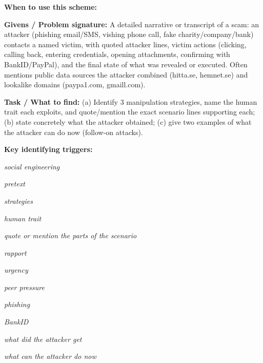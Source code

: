\documentclass[12pt, a4paper]{article}
\begin{document}
\textbf{When to use this scheme:}

\textbf{Givens / Problem signature:}
A detailed narrative or transcript of a scam: an attacker (phishing email/SMS, vishing phone call, fake charity/company/bank) contacts a named victim, with quoted attacker lines, victim actions (clicking, calling back, entering credentials, opening attachments, confirming with BankID/PayPal), and the final state of what was revealed or executed.
Often mentions public data sources the attacker combined (hitta.se, hemnet.se) and lookalike domains (paypa1.com, gmaill.com).

\textbf{Task / What to find:}
(a) Identify 3 manipulation strategies, name the human trait each exploits, and quote/mention the exact scenario lines supporting each; (b) state concretely what the attacker obtained; (c) give two examples of what the attacker can do now (follow-on attacks).

\textbf{Key identifying triggers:}
\begin{tightitem}
        \item \textit{social engineering}
        \item \textit{pretext}
        \item \textit{strategies}
        \item \textit{human trait}
        \item \textit{quote or mention the parts of the scenario}
        \item \textit{rapport}
        \item \textit{urgency}
        \item \textit{peer pressure}
        \item \textit{phishing}
        \item \textit{BankID}
        \item \textit{what did the attacker get}
        \item \textit{what can the attacker do now}
    \end{tightitem}
\end{document}
